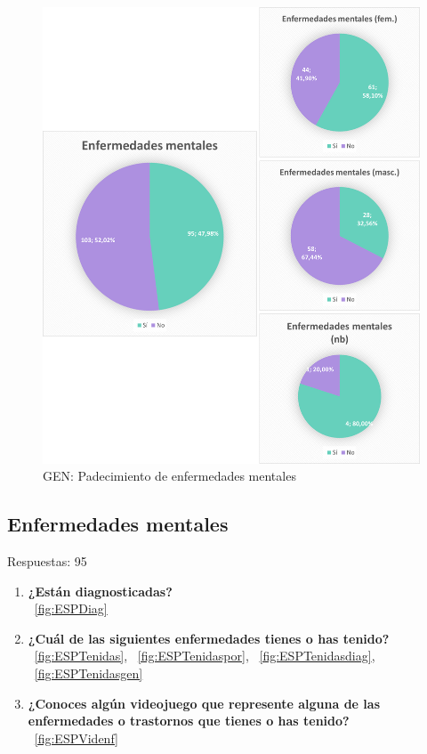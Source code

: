 \documentclass[12pt, a4paper,twoside,titlepage]{book}
\begin{document}
\begin{figure}
    \centering
    \includegraphics[width=1\linewidth]{ANEXO ESP/20AnexESPEnf}
    \caption{GEN: Padecimiento de enfermedades mentales}
    \label{fig:ESPEnf}
\end{figure}


\subsection{Enfermedades mentales}
Respuestas: 95
\begin{enumerate}[label=\textbf{\arabic*}.]
      \item \textbf{¿Están diagnosticadas? }\\
     ~\ref{fig:ESPDiag}
     \item \textbf{¿Cuál de las siguientes enfermedades tienes o has tenido?}\\
    ~\ref{fig:ESPTenidas},  ~\ref{fig:ESPTenidaspor},  ~\ref{fig:ESPTenidasdiag},  ~\ref{fig:ESPTenidasgen}
     \item \textbf{¿Conoces algún videojuego que represente alguna de las enfermedades o trastornos que tienes o has tenido?}\\
    ~\ref{fig:ESPVidenf}
\end{enumerate}
\end{document}
